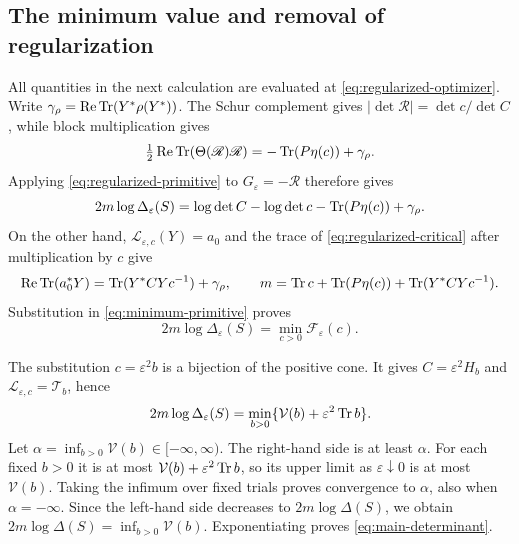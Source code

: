 \subsection{The minimum value and removal of regularization}
All quantities in the next calculation are evaluated at \eqref{eq:regularized-optimizer}.
Write $\gamma_\rho=\operatorname{Re}\operatorname{Tr}(Y^*\rho(Y^*))$.
The Schur complement gives $|\det\mathscr R|=\det c/\det C$, while block multiplication gives
\[
 \tfrac12\operatorname{Re}\operatorname{Tr}(\Theta(\mathscr R)\mathscr R)
       =-\operatorname{Tr}(P\eta(c))+\gamma_\rho.
\]
Applying \eqref{eq:regularized-primitive} to $G_\varepsilon=-\mathscr R$ therefore gives
\begin{equation}\label{eq:minimum-primitive}
 2m\log\Delta_\varepsilon(S)
 =\log\det C-\log\det c-\operatorname{Tr}(P\eta(c))+\gamma_\rho.
\end{equation}
On the other hand, $\mathcal L_{\varepsilon,c}(Y)=a_0$ and the trace of \eqref{eq:regularized-critical} after multiplication by $c$ give
\[
 \operatorname{Re}\operatorname{Tr}(a_0^*Y)=\operatorname{Tr}(Y^*CYc^{-1})+\gamma_\rho,
 \qquad
 m=\operatorname{Tr} c+\operatorname{Tr}(P\eta(c))+\operatorname{Tr}(Y^*CYc^{-1}).
\]
Substitution in \eqref{eq:minimum-primitive} proves
\begin{equation}\label{eq:regularized-minimum}
 2m\log\Delta_\varepsilon(S)=\min_{c>0}\mathcal F_\varepsilon(c).
\end{equation}

The substitution $c=\varepsilon^2b$ is a bijection of the positive cone.
It gives $C=\varepsilon^2H_b$ and $\mathcal L_{\varepsilon,c}=\mathcal T_b$, hence
\begin{equation}\label{eq:scaled-minimum}
 2m\log\Delta_\varepsilon(S)
      =\min_{b>0}\{\mathcal V(b)+\varepsilon^2\operatorname{Tr} b\}.
\end{equation}
Let $\alpha=\inf_{b>0}\mathcal V(b)\in[-\infty,\infty)$.
The right-hand side is at least $\alpha$.
For each fixed $b>0$ it is at most $\mathcal V(b)+\varepsilon^2\operatorname{Tr} b$, so its upper limit as $\varepsilon\downarrow0$ is at most $\mathcal V(b)$.
Taking the infimum over fixed trials proves convergence to $\alpha$, also when $\alpha=-\infty$.
Since the left-hand side decreases to $2m\log\Delta(S)$, we obtain $2m\log\Delta(S)=\inf_{b>0}\mathcal V(b)$.
Exponentiating proves \eqref{eq:main-determinant}.


